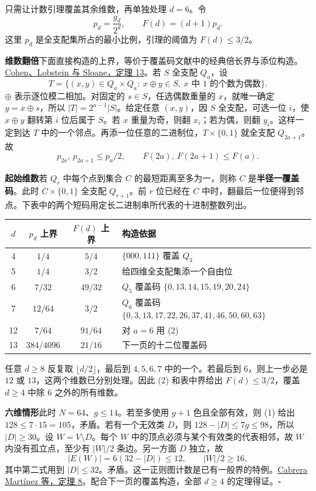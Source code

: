 \documentclass[11pt,a4paper]{article}
\newcommand{\sect}[1]{\par\vspace{4pt}{\large\sffamily\bfseries\color{accent}#1}\par}
\newcommand{\subh}[1]{\par\textbf{#1}\quad}
\newcommand{\finish}{\hfill$\square$}
\begin{document}
\newpage
\sect{推广到所有维数}
只需让计数引理覆盖其余维数，再单独处理 $d=6$。令
\[
               p_d=\frac{g_d}{2^d},\qquad F(d)=(d+1)p_d.
\]
这里 $p_d$ 是全支配集所占的最小比例，引理的阈值为 $F(d)\le3/2$。

\subh{维数翻倍}下面直接构造的上界，等价于覆盖码文献中的经典倍长界与添位构造。\href{https://doi.org/10.1109/TIT.1986.1057227}{Cohen、Lobstein 与 Sloane，定理 13}。若 $S$ 全支配 $Q_a$，设
\[
  T=\{(x,y)\in Q_a\times Q_a:\ x\oplus y\in S,\ 
                       x\text{ 中 }1\text{ 的个数为偶数}\}.
\]
$\oplus$ 表示逐位模二相加。对固定的 $s\in S$，任选偶数重量的 $x$，就唯一确定 $y=x\oplus s$，所以 $|T|=2^{a-1}|S|$。给定任意 $(x,y)$，因 $S$ 全支配，可选一位 $i$，使 $x\oplus y$ 翻转第 $i$ 位后属于 $S$。若 $x$ 重量为奇，则翻 $x_i$；若为偶，则翻 $y_i$。这样一定到达 $T$ 中的一个邻点。再添一位任意的二进制位，$T\times\{0,1\}$ 就全支配 $Q_{2a+1}$。故
\[
 p_{2a},\,p_{2a+1}\le p_a/2,\qquad F(2a),\,F(2a+1)\le F(a). \tag{2}
\]

\subh{起始维数}若 $Q_r$ 中每个点到集合 $C$ 的最短距离至多为一，则称 $C$ 是\textbf{半径一覆盖码}。此时 $C\times\{0,1\}$ 全支配 $Q_{r+1}$。前 $r$ 位已经在 $C$ 中时，翻最后一位便得到邻点。下表中的两个短码用定长二进制串所代表的十进制整数列出。
\begin{center}
\small\renewcommand{\arraystretch}{1.2}
\begin{tabular}{@{}c c c l@{}}\toprule
$d$ & $p_d$ 上界 & $F(d)$ 上界 & 构造依据\\ \midrule
4 & $1/4$ & $5/4$ & $\{000,111\}$ 覆盖 $Q_3$\\
5 & $1/4$ & $3/2$ & 给四维全支配集添一个自由位\\
6 & $7/32$ & $49/32$ & $Q_5$ 覆盖码 $\{0,13,14,15,19,20,24\}$\\
7 & $12/64$ & $3/2$ & $Q_6$ 覆盖码 $\{0,3,13,17,22,26,37,41,46,50,60,63\}$\\
12 & $7/64$ & $91/64$ & 对 $a=6$ 用 (2)\\
13 & $384/4096$ & $21/16$ & 下一页的十二位覆盖码\\
\bottomrule
\end{tabular}
\end{center}
任意 $d\ge8$ 反复取 $\lfloor d/2\rfloor$，最后到 $4,5,6,7$ 中的一个。若最后到 $6$，则上一步必是 $12$ 或 $13$，这两个维数已分别处理。因此 (2) 和表中界给出 $F(d)\le3/2$，覆盖 $d\ge4$ 中除 $6$ 之外的所有维数。

\subh{六维情形}此时 $N=64$、$g\le14$。若至多使用 $g+1$ 色且全部有效，则 (1) 给出 $128\le7\cdot15=105$，矛盾。若有一个无效类 $D$，则 $128-|D|\le7g\le98$，所以 $|D|\ge30$。设 $W=V\setminus D$。每个 $W$ 中的顶点必须与某个有效类的代表相邻，故 $W$ 内没有孤立点，至少有 $|W|/2$ 条边。另一方面 $D$ 独立，故
\[
         |E(W)|=6(32-|D|)\le12,\qquad |W|/2\ge16,
\]
其中第二式用到 $|D|\le32$。矛盾。这一正则图计数是已有一般界的特例。\href{https://doi.org/10.3390/math8020194}{Cabrera Martínez 等，定理 8}。配合下一页的覆盖构造，全部 $d\ge4$ 的定理得证。\finish
\end{document}
